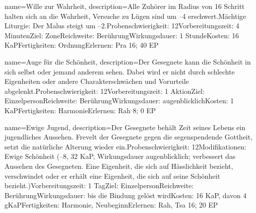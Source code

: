 {
    name={Wille zur Wahrheit},
    description={Alle Zuhörer im Radius von 16 Schritt halten sich an die Wahrheit, Versuche zu Lügen sind um –4 erschwert.\newline Mächtige Liturgie: Der Malus steigt um –2.\newline Probenschwierigkeit: 12\newline Vorbereitungszeit: 4 Minuten\newline Ziel: Zone\newline Reichweite: Berührung\newline Wirkungsdauer: 1 Stunde\newline Kosten: 16 KaP\newline Fertigkeiten: Ordnung\newline Erlernen: Pra 16; 40 EP}
}


{
    name={Auge für die Schönheit},
    description={Der Gesegnete kann die Schönheit in sich selbst oder jemand anderem sehen. Dabei wird er nicht durch schlechte Eigenheiten oder andere Charakterschwächen und Vorurteile abgelenkt.\newline Probenschwierigkeit: 12\newline Vorbereitungszeit: 1 Aktion\newline Ziel: Einzelperson\newline Reichweite: Berührung\newline Wirkungsdauer: augenblicklich\newline Kosten: 1 KaP\newline Fertigkeiten: Harmonie\newline Erlernen: Rah 8; 0 EP}
}


{
    name={Ewige Jugend},
    description={Der Gesegnete behält Zeit seines Lebens ein jugendliches Aussehen. Frevelt der Gesegnete gegen die segenspendende Gottheit, setzt die natürliche Alterung wieder ein.\newline Probenschwierigkeit: 12\newline Modifikationen: Ewige Schönheit (–8, 32 KaP, Wirkungsdauer augenblicklich; verbessert das Aussehen des Gesegneten. Eine Eigenheit, die sich auf Hässlichkeit bezieht, verschwindet oder er erhält eine Eigenheit, die sich auf seine Schönheit bezieht.)\newline Vorbereitungszeit: 1 Tag\newline Ziel: Einzelperson\newline Reichweite: Berührung\newline Wirkungsdauer: bis die Bindung gelöst wird\newline Kosten: 16 KaP, davon 4 gKaP\newline Fertigkeiten: Harmonie, Neubeginn\newline Erlernen: Rah, Tsa 16; 20 EP}
}


